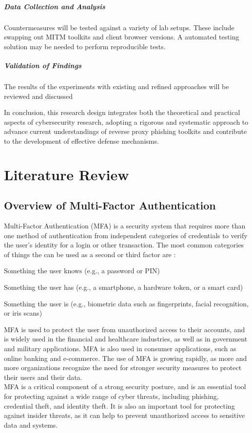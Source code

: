 \documentclass[12pt]{scrbook}
\begin{document}
\paragraph{Data Collection and Analysis}
Countermeasures will be tested against a variety of lab setups.
These include swapping out MITM toolkits and client browser versions.
A automated testing solution may be needed to perform reproducible tests.

\paragraph{Validation of Findings}
The results of the experiments with existing and refined approaches will be reviewed
and discussed

In conclusion, this research design integrates both the theoretical and practical
aspects of cybersecurity research, adopting a rigorous and systematic approach
to advance current understandings of reverse proxy phishing toolkits and
contribute to the development of effective defense mechanisms.

\newpage \chapter{Literature Review} \section{Overview of Multi-Factor
  Authentication}

Multi-Factor Authentication (MFA) is a security system that requires more than
one method of authentication from independent categories of credentials to
verify the user's identity for a login or other transaction. The most common
categories of things the can be used as a second or third factor are \cite{mfa}:
\begin{compactitem}
	\item Something the user knows (e.g., a password or PIN)
	\item Something the user has (e.g., a smartphone, a hardware token, or a smart
	card)
	\item Something the user is (e.g., biometric data such as fingerprints, facial
	recognition, or iris scans)
\end{compactitem}

MFA is used to protect the user from unauthorized access to their accounts, and
is widely used in the financial and healthcare industries, as well as in government and
military applications. MFA is also used in consumer applications, such as
online banking and e-commerce. The use of MFA is growing rapidly, as more and
more organizations recognize the need for stronger security measures to
protect their users and their data.\\MFA is a critical component of a
strong security posture, and is an essential tool for protecting against a
wide range of cyber threats, including phishing, credential theft, and
identity theft. It is also an important tool for protecting against insider
threats, as it can help to prevent unauthorized access to sensitive data and
systems.
\end{document}
